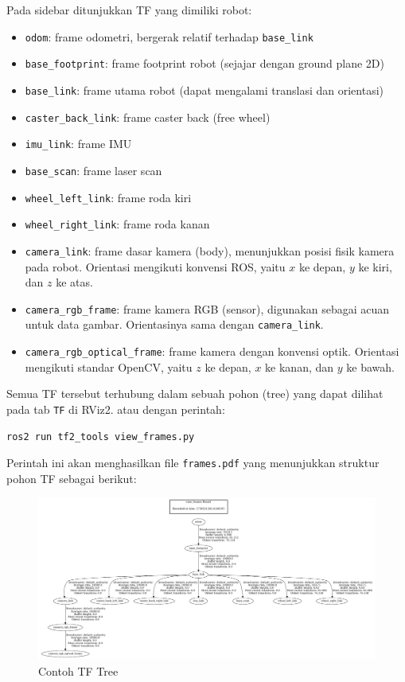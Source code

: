 \documentclass{article}
\begin{document}
Pada sidebar ditunjukkan TF yang dimiliki robot:
\begin{itemize}
  \item \texttt{odom}: frame odometri, bergerak relatif terhadap \texttt{base\_link}
  \item \texttt{base\_footprint}: frame footprint robot (sejajar dengan ground plane 2D)
  \item \texttt{base\_link}: frame utama robot (dapat mengalami translasi dan orientasi)
  \item \texttt{caster\_back\_link}: frame caster back (free wheel)
  \item \texttt{imu\_link}: frame IMU
  \item \texttt{base\_scan}: frame laser scan
  \item \texttt{wheel\_left\_link}: frame roda kiri
  \item \texttt{wheel\_right\_link}: frame roda kanan
  \item \texttt{camera\_link}: frame dasar kamera (body), menunjukkan posisi fisik kamera pada robot. Orientasi mengikuti konvensi ROS, yaitu $x$ ke depan, $y$ ke kiri, dan $z$ ke atas.
  \item \texttt{camera\_rgb\_frame}: frame kamera RGB (sensor), digunakan sebagai acuan untuk data gambar. Orientasinya sama dengan \texttt{camera\_link}.
  \item \texttt{camera\_rgb\_optical\_frame}: frame kamera dengan konvensi optik. Orientasi mengikuti standar OpenCV, yaitu $z$ ke depan, $x$ ke kanan, dan $y$ ke bawah.
\end{itemize}
Semua TF tersebut terhubung dalam sebuah pohon (tree) yang dapat dilihat pada tab \texttt{TF} di RViz2. atau dengan perintah:
\begin{verbatim}
ros2 run tf2_tools view_frames.py
\end{verbatim}
Perintah ini akan menghasilkan file \texttt{frames.pdf} yang menunjukkan struktur pohon TF sebagai berikut:
\begin{figure}[H]
  \centering
  \includegraphics[width=1\textwidth]{tf_tree.png}
  \caption{Contoh TF Tree}
\end{figure}
\end{document}
